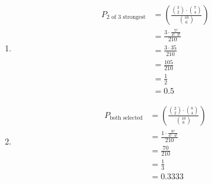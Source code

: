 \documentclass[a4paper, 10pt]{article}
\begin{document}
\begin{enumerate}[label=(\alph*)]
                \item
                \[
                    \begin{aligned}
                        P_{2 \text{ of 3 strongest}} &= \left( \frac{\binom{3}{2} \cdot \binom{7}{4}}{\binom{10}{6}} \right) \\
                        &= \frac{3 \cdot \frac{7!}{4! \cdot 3!}}{210} \\
                        &= \frac{3 \cdot 35}{210} \\
                        &= \frac{105}{210} \\
                        &= \frac{1}{2} \\
                        &= \boxed{0.5}
                    \end{aligned}
                \]

                \item
                \[
                    \begin{aligned}
                        P_{\text{both selected}} &= \left( \frac{\binom{2}{2} \cdot \binom{8}{4}}{\binom{10}{6}} \right) \\
                        &= \frac{1 \cdot \frac{8!}{4! \cdot 4!}}{210} \\
                        &= \frac{70}{210} \\
                        &= \frac{1}{3} \\
                        &= \boxed{0.3333}
                    \end{aligned}
                \]
            \end{enumerate}

    \pagebreak
\end{document}
